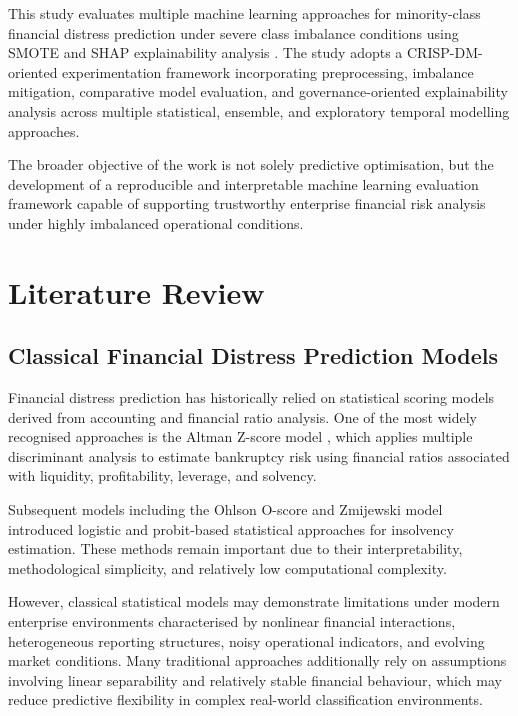 \documentclass{article}
\begin{document}
This study evaluates multiple machine learning approaches for minority-class financial distress prediction under severe class imbalance conditions using SMOTE \cite{chawla2002smote} and SHAP explainability analysis \cite{lundberg2017unified}. The study adopts a CRISP-DM-oriented experimentation framework incorporating preprocessing, imbalance mitigation, comparative model evaluation, and governance-oriented explainability analysis across multiple statistical, ensemble, and exploratory temporal modelling approaches.

The broader objective of the work is not solely predictive optimisation, but the development of a reproducible and interpretable machine learning evaluation framework capable of supporting trustworthy enterprise financial risk analysis under highly imbalanced operational conditions.

\section{Literature Review}

\subsection{Classical Financial Distress Prediction Models}

Financial distress prediction has historically relied on statistical scoring models derived from accounting and financial ratio analysis. One of the most widely recognised approaches is the Altman Z-score model \cite{altman1968}, which applies multiple discriminant analysis to estimate bankruptcy risk using financial ratios associated with liquidity, profitability, leverage, and solvency.

Subsequent models including the Ohlson O-score \cite{ohlson1980} and Zmijewski model \cite{zmijewski1984} introduced logistic and probit-based statistical approaches for insolvency estimation. These methods remain important due to their interpretability, methodological simplicity, and relatively low computational complexity.

However, classical statistical models may demonstrate limitations under modern enterprise environments characterised by nonlinear financial interactions, heterogeneous reporting structures, noisy operational indicators, and evolving market conditions. Many traditional approaches additionally rely on assumptions involving linear separability and relatively stable financial behaviour, which may reduce predictive flexibility in complex real-world classification environments.
\end{document}
